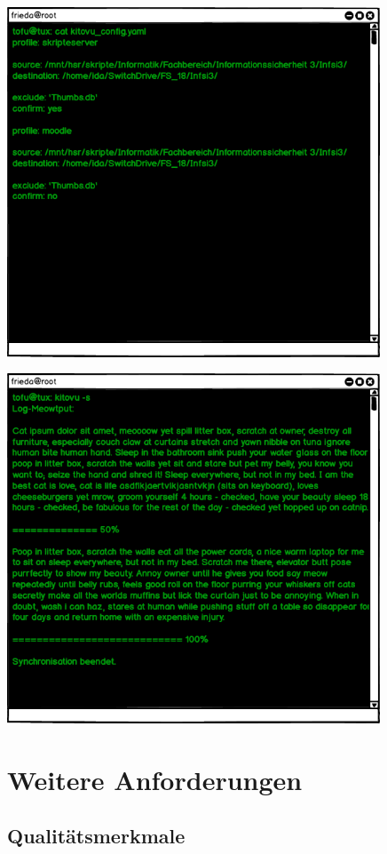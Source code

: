 \documentclass[a4paper]{article}
\let\oldsection\section
\renewcommand\section{\clearpage\oldsection}
\begin{document}
	\includegraphics[width=30em]{./mockups/terminal02.png}
	
	\includegraphics[width=30em]{./mockups/terminal03.png}
	
\section{Weitere Anforderungen}

\subsection{Qualitätsmerkmale}
\end{document}
